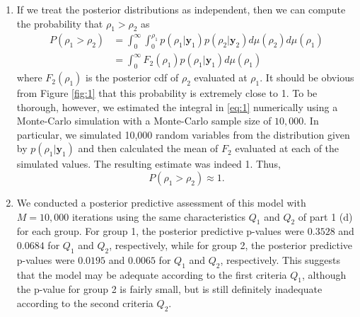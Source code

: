 \documentclass[12pt]{article}
\begin{document}
\begin{enumerate}[leftmargin=*]
\begin{enumerate}[leftmargin=1mm]
      \item If we treat the posterior distributions as independent, then we can compute the probability that $\rho_1 > \rho_2$ as
        \begin{align}
          P(\rho_1 > \rho_2) & = \int_{0}^{\infty}\int_{0}^{\rho_1}p(\rho_1|\bm{y}_1)p(\rho_2|\bm{y}_2) d\mu(\rho_2)d\mu(\rho_1) \nonumber \\
          & = \int_{0}^{\infty} F_{2}(\rho_1)p(\rho_1|\bm{y}_1) d\mu(\rho_1) \label{eq:1}
        \end{align}
        where $F_{2}(\rho_1)$ is the posterior cdf of $\rho_2$ evaluated at $\rho_1$.
        It should be obvious from Figure \ref{fig:1} that this probability is extremely close to 1. To be thorough, however, we estimated the integral
        in \eqref{eq:1}
        numerically using a 
        Monte-Carlo simulation with a Monte-Carlo sample size of $10,000$. 
        In particular, we simulated 10,000 random variables from the distribution given by $p(\rho_1|\bm{y}_1)$ and then calculated the mean 
        of $F_{2}$ evaluated at each of the simulated values. The resulting estimate was indeed 1. Thus,
        \[
          P(\rho_1 > \rho_2) \approx 1.
        \]

      \item We conducted a posterior predictive assessment of this model with $M = 10,000$ iterations 
        using the same characteristics $Q_1$ and $Q_2$ of part 1 (d) for each group. For group 1, the posterior predictive p-values 
        were $0.3528$ and $0.0684$ for $Q_1$ and $Q_2$, respectively, while for group 2, the posterior predictive p-values were
        $0.0195$ and $0.0065$ for $Q_1$ and $Q_2$, respectively. This suggests that the model may be adequate according to the first criteria $Q_1$,
        although the p-value for group 2 is fairly small, but
        is still definitely inadequate according to the second criteria $Q_2$.


\end{enumerate}
\end{enumerate}
\end{document}
